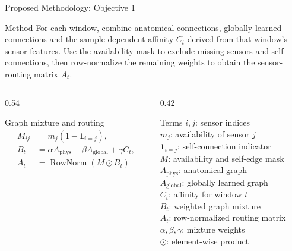 \documentclass[10pt,aspectratio=169]{beamer}
\begin{document}
\begin{frame}[t]{Proposed Methodology: Objective 1}
\begin{block}{Method}
For each window, combine anatomical connections, globally learned connections and the sample-dependent affinity $C_t$ derived from that window's sensor features. Use the availability mask to exclude missing sensors and self-connections, then row-normalize the remaining weights to obtain the sensor-routing matrix $A_t$.
\end{block}
\vspace{-3pt}
\begin{columns}[T,onlytextwidth]
\begin{column}{0.54\textwidth}
\begin{block}{Graph mixture and routing}
\footnotesize
\[
\begin{aligned}
M_{ij}&=m_j(1-\mathbf 1_{i=j}),\\
B_t&=\alpha A_{\mathrm{phys}}+\beta A_{\mathrm{global}}+\gamma C_t,\\
A_t&=\operatorname{RowNorm}(M\odot B_t)
\end{aligned}
\]
\end{block}
\end{column}
\begin{column}{0.42\textwidth}
\begin{block}{Terms}
\footnotesize
$i,j$: sensor indices\\
$m_j$: availability of sensor $j$\\
$\mathbf 1_{i=j}$: self-connection indicator\\
$M$: availability and self-edge mask\\
$A_{\mathrm{phys}}$: anatomical graph\\
$A_{\mathrm{global}}$: globally learned graph\\
$C_t$: affinity for window $t$\\
$B_t$: weighted graph mixture\\
$A_t$: row-normalized routing matrix\\
$\alpha,\beta,\gamma$: mixture weights\\
$\odot$: element-wise product
\end{block}
\end{column}
\end{columns}
\end{frame}
\end{document}
